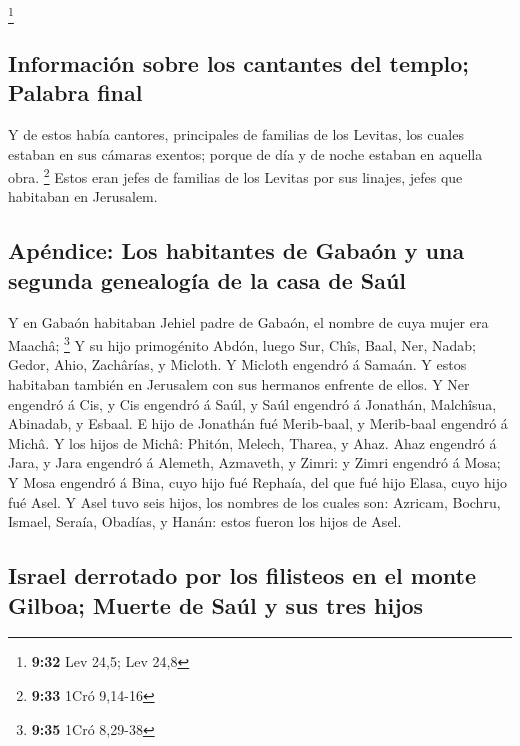 \footnote{\textbf{9:32} Lev 24,5; Lev 24,8}

\hypertarget{informaciuxf3n-sobre-los-cantantes-del-templo-palabra-final}{%
\subsection{Información sobre los cantantes del templo; Palabra
final}\label{informaciuxf3n-sobre-los-cantantes-del-templo-palabra-final}}

 Y de estos había cantores, principales de familias de
los Levitas, los cuales estaban en sus cámaras exentos; porque de día y
de noche estaban en aquella obra. \footnote{\textbf{9:33} 1Cró 9,14-16}
 Estos eran jefes de familias de los Levitas por sus
linajes, jefes que habitaban en Jerusalem.

\hypertarget{apuxe9ndice-los-habitantes-de-gabauxf3n-y-una-segunda-genealoguxeda-de-la-casa-de-sauxfal}{%
\subsection{Apéndice: Los habitantes de Gabaón y una segunda genealogía
de la casa de
Saúl}\label{apuxe9ndice-los-habitantes-de-gabauxf3n-y-una-segunda-genealoguxeda-de-la-casa-de-sauxfal}}

 Y en Gabaón habitaban Jehiel padre de Gabaón, el nombre
de cuya mujer era Maachâ; \footnote{\textbf{9:35} 1Cró 8,29-38}
 Y su hijo primogénito Abdón, luego Sur, Chîs, Baal, Ner,
Nadab;  Gedor, Ahio, Zachârías, y Micloth.
 Y Micloth engendró á Samaán. Y estos habitaban también
en Jerusalem con sus hermanos enfrente de ellos.  Y Ner
engendró á Cis, y Cis engendró á Saúl, y Saúl engendró á Jonathán,
Malchîsua, Abinadab, y Esbaal.  E hijo de Jonathán fué
Merib-baal, y Merib-baal engendró á Michâ.  Y los hijos
de Michâ: Phitón, Melech, Tharea, y Ahaz.  Ahaz engendró
á Jara, y Jara engendró á Alemeth, Azmaveth, y Zimri: y Zimri engendró á
Mosa;  Y Mosa engendró á Bina, cuyo hijo fué Rephaía, del
que fué hijo Elasa, cuyo hijo fué Asel.  Y Asel tuvo seis
hijos, los nombres de los cuales son: Azricam, Bochru, Ismael, Seraía,
Obadías, y Hanán: estos fueron los hijos de Asel.

\hypertarget{israel-derrotado-por-los-filisteos-en-el-monte-gilboa-muerte-de-sauxfal-y-sus-tres-hijos}{%
\subsection{Israel derrotado por los filisteos en el monte Gilboa;
Muerte de Saúl y sus tres
hijos}\label{israel-derrotado-por-los-filisteos-en-el-monte-gilboa-muerte-de-sauxfal-y-sus-tres-hijos}}

